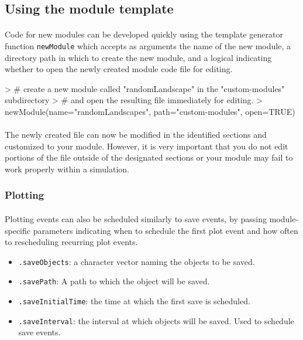 \documentclass{article}
\begin{document}
\subsection{Using the module template}

\paragraph{}
Code for new modules can be developed quickly using the template generator function \texttt{newModule} which accepts as arguments the name of the new module, a directory path in which to create the new module, and a logical indicating whether to open the newly created module code file for editing.

\begin{Schunk}
\begin{Sinput}
> # create a new module called "randomLandscape" in the "custom-modules" subdirectory
> # and open the resulting file immediately for editing.
> newModule(name="randomLandscapes", path="custom-modules", open=TRUE)
\end{Sinput}
\end{Schunk}

\paragraph{}
The newly created file can now be modified in the identified sections and customized to your module. However, it is very important that you do not edit portions of the file outside of the designated sections or your module may fail to work properly within a simulation.

\subsubsection{Plotting}

\paragraph{}
Plotting events can also be scheduled similarly to save events, by passing module-specific parameters indicating when to schedule the first plot event and how often to rescheduling recurring plot events.

\begin{itemize}
  \item \texttt{.saveObjects}: a character vector naming the objects to be saved.
  \item \texttt{.savePath}: A path to which the object will be saved.
  \item \texttt{.saveInitialTime}: the time at which the first save is scheduled.
  \item \texttt{.saveInterval}: the interval at which objects will be saved. Used to schedule save events.
\end{itemize}
\end{document}
